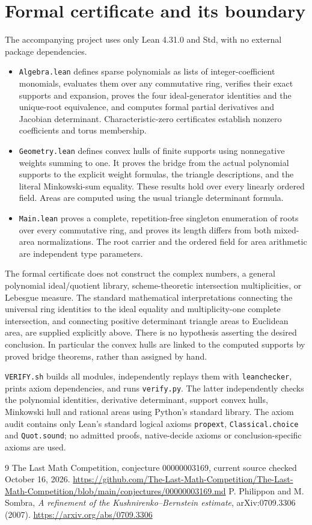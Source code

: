 \documentclass[11pt]{article}
\begin{document}
\section{Formal certificate and its boundary}
The accompanying project uses only Lean 4.31.0 and Std, with no external package dependencies.
\begin{itemize}
\item \texttt{Algebra.lean} defines sparse polynomials as lists of integer-coefficient monomials, evaluates them over any commutative ring, verifies their exact supports and expansion, proves the four ideal-generator identities and the unique-root equivalence, and computes formal partial derivatives and Jacobian determinant. Characteristic-zero certificates establish nonzero coefficients and torus membership.
\item \texttt{Geometry.lean} defines convex hulls of finite supports using nonnegative weights summing to one. It proves the bridge from the actual polynomial supports to the explicit weight formulas, the triangle descriptions, and the literal Minkowski-sum equality. These results hold over every linearly ordered field. Areas are computed using the usual triangle determinant formula.
\item \texttt{Main.lean} proves a complete, repetition-free singleton enumeration of roots over every commutative ring, and proves its length differs from both mixed-area normalizations. The root carrier and the ordered field for area arithmetic are independent type parameters.
\end{itemize}
The formal certificate does not construct the complex numbers, a general polynomial ideal/quotient library, scheme-theoretic intersection multiplicities, or Lebesgue measure. The standard mathematical interpretations connecting the universal ring identities to the ideal equality and multiplicity-one complete intersection, and connecting positive determinant triangle areas to Euclidean area, are supplied explicitly above. There is no hypothesis asserting the desired conclusion. In particular the convex hulls are linked to the computed supports by proved bridge theorems, rather than assigned by hand.

\texttt{VERIFY.sh} builds all modules, independently replays them with \texttt{leanchecker}, prints axiom dependencies, and runs \texttt{verify.py}. The latter independently checks the polynomial identities, derivative determinant, support convex hulls, Minkowski hull and rational areas using Python's standard library. The axiom audit contains only Lean's standard logical axioms \texttt{propext}, \texttt{Classical.choice} and \texttt{Quot.sound}; no admitted proofs, native-decide axioms or conclusion-specific axioms are used.
\begin{thebibliography}{9}
 The Last Math Competition, conjecture 00000003169, current source checked October 16, 2026.\newline
\url{https://github.com/The-Last-Math-Competition/The-Last-Math-Competition/blob/main/conjectures/00000003169.md}
 P. Philippon and M. Sombra, \emph{A refinement of the Kushnirenko--Bernstein estimate}, arXiv:0709.3306 (2007).\newline
\url{https://arxiv.org/abs/0709.3306}
\end{thebibliography}
\end{document}
